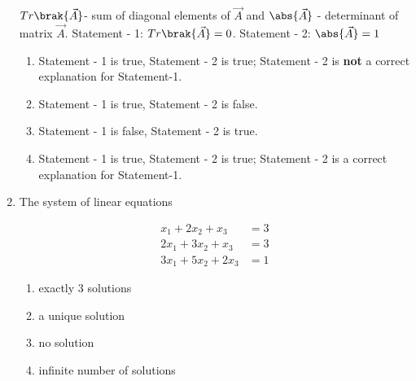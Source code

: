 \begin{enumerate}
	\newline
	$Tr\brak{\vec{A}}$- sum of diagonal elements of $\vec{A}$ and
	\newline
	$\abs{\vec{A}}$ - determinant of matrix $\vec{A}$.
	\newline
	{Statement - 1:} $Tr\brak{\vec{A}} = 0$.
	\newline
	{Statement - 2:} $\abs{\vec{A}} = 1$
	\hfill{}
	\begin{enumerate}
		\item Statement - 1 is true, Statement - 2 is true; Statement - 2 is \textbf{not} a correct explanation for Statement-1. 
	    	\item Statement - 1 is true, Statement - 2 is false. 
	    	\item Statement - 1 is false, Statement - 2 is true.
	    	\item Statement - 1 is true, Statement - 2 is true; Statement - 2 is a correct explanation for Statement-1. 
	\end{enumerate}
%
    \item The system of linear equations
	\hfill{}{\par}
	\begin{align*}
		x_1 + 2x_2 + x_3 &= 3\\
		2x_1 + 3x_2 + x_3 &= 3\\
		3x_1 + 5x_2 + 2x_3 &= 1
	\end{align*}
\begin{multicols}{2}
	\begin{enumerate}
		\item exactly $3$ solutions
	    	\item a unique solution
	    	\item no solution
	    	\item infinite number of solutions
	\end{enumerate}
\end{multicols}


\end{enumerate}
